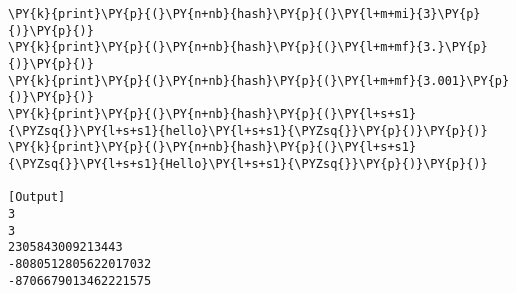\begin{Verbatim}[label=\makebox{\url{https://github.com/lucabaldini/cmepda/tree/master/slides/latex/snippets/hashing.py}},commandchars=\\\{\}]
\PY{k}{print}\PY{p}{(}\PY{n+nb}{hash}\PY{p}{(}\PY{l+m+mi}{3}\PY{p}{)}\PY{p}{)}
\PY{k}{print}\PY{p}{(}\PY{n+nb}{hash}\PY{p}{(}\PY{l+m+mf}{3.}\PY{p}{)}\PY{p}{)}
\PY{k}{print}\PY{p}{(}\PY{n+nb}{hash}\PY{p}{(}\PY{l+m+mf}{3.001}\PY{p}{)}\PY{p}{)}
\PY{k}{print}\PY{p}{(}\PY{n+nb}{hash}\PY{p}{(}\PY{l+s+s1}{\PYZsq{}}\PY{l+s+s1}{hello}\PY{l+s+s1}{\PYZsq{}}\PY{p}{)}\PY{p}{)}
\PY{k}{print}\PY{p}{(}\PY{n+nb}{hash}\PY{p}{(}\PY{l+s+s1}{\PYZsq{}}\PY{l+s+s1}{Hello}\PY{l+s+s1}{\PYZsq{}}\PY{p}{)}\PY{p}{)}

[Output]
3
3
2305843009213443
-8080512805622017032
-8706679013462221575
\end{Verbatim}